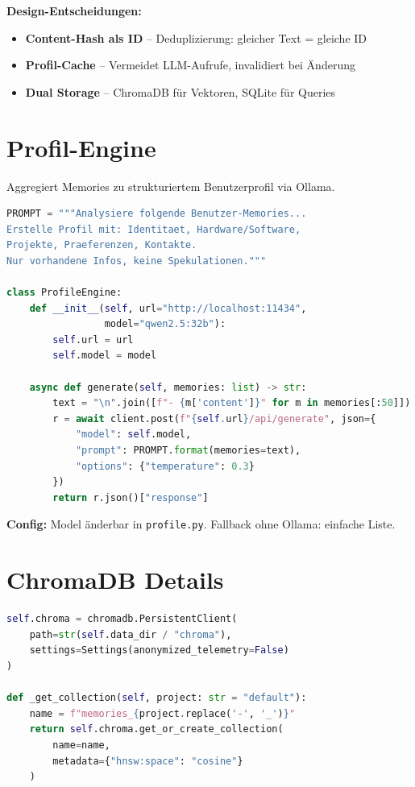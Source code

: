 \documentclass[11pt,a4paper]{article}
\begin{document}
\textbf{Design-Entscheidungen:}
\begin{itemize}
    \item \textbf{Content-Hash als ID} -- Deduplizierung: gleicher Text = gleiche ID
    \item \textbf{Profil-Cache} -- Vermeidet LLM-Aufrufe, invalidiert bei Änderung
    \item \textbf{Dual Storage} -- ChromaDB für Vektoren, SQLite für Queries
\end{itemize}


\section{Profil-Engine}

Aggregiert Memories zu strukturiertem Benutzerprofil via Ollama.

\begin{lstlisting}[style=code,language=Python,caption={profile.py}]
PROMPT = """Analysiere folgende Benutzer-Memories...
Erstelle Profil mit: Identitaet, Hardware/Software, 
Projekte, Praeferenzen, Kontakte.
Nur vorhandene Infos, keine Spekulationen."""

class ProfileEngine:
    def __init__(self, url="http://localhost:11434", 
                 model="qwen2.5:32b"):
        self.url = url
        self.model = model
    
    async def generate(self, memories: list) -> str:
        text = "\n".join([f"- {m['content']}" for m in memories[:50]])
        r = await client.post(f"{self.url}/api/generate", json={
            "model": self.model,
            "prompt": PROMPT.format(memories=text),
            "options": {"temperature": 0.3}
        })
        return r.json()["response"]
\end{lstlisting}

\textbf{Config:} Model änderbar in \texttt{profile.py}. Fallback ohne Ollama: einfache Liste.

\section{ChromaDB Details}

\begin{lstlisting}[style=code,language=Python,caption={ChromaDB Init}]
self.chroma = chromadb.PersistentClient(
    path=str(self.data_dir / "chroma"),
    settings=Settings(anonymized_telemetry=False)
)

def _get_collection(self, project: str = "default"):
    name = f"memories_{project.replace('-', '_')}"
    return self.chroma.get_or_create_collection(
        name=name, 
        metadata={"hnsw:space": "cosine"}
    )
\end{lstlisting}
\end{document}
